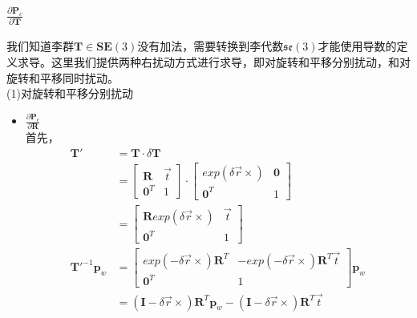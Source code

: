 \documentclass{article}
\begin{document}
\subsubsection{$\frac{\partial{\boldsymbol{P}_c}}{\partial{\boldsymbol{T}}}$}
我们知道李群$\boldsymbol{T}\in\boldsymbol{SE}(3)$没有加法，需要转换到李代数$\mathfrak{se}(3)$才能使用导数的定义求导。这里我们提供两种右扰动方式进行求导，即对旋转和平移分别扰动，和对旋转和平移同时扰动。\\
(1)对旋转和平移分别扰动
\begin{itemize}
	\item $\frac{\partial{\boldsymbol{P}_c}}{\partial{\boldsymbol{R}}}$\\
	      首先，
	      $$
	      \begin{aligned}
	      	\boldsymbol{T}'                               & = {\boldsymbol{T}} \cdot \delta\boldsymbol{T}         \\&=
	      	\left[ 
	      	\begin{matrix} 
	      	\boldsymbol{R}                                & \vec{t}                                               \\  
	      	\boldsymbol{0}^T                              & 1                                                     
	      	\end{matrix}
	      	\right]\cdot
	      	\left[
	      	\begin{matrix}
	      	exp(\delta{\vec{r}} \times)                   & \boldsymbol{0}                                        \\
	      	\boldsymbol{0}^T                              & 1                                                     
	      	\end{matrix}
	      	\right]
	      	\\&=
	      	\left[
	      	\begin{matrix}
	      	\boldsymbol{R}exp(\delta{\vec{r}}\times)      & \vec{t}                                               \\
	      	\boldsymbol{0}^T                              & 1                                                     
	      	\end{matrix}
	      	\right] \\
	      	\boldsymbol{T}'^{-1}\boldsymbol{p}_w          & =                                                     
	      	\left[
	      	\begin{matrix}
	      	exp(-\delta{\vec{r}}\times)\boldsymbol{R}^{T} & -exp(-\delta{\vec{r}}\times)\boldsymbol{R}^{T}\vec{t} \\
	      	\boldsymbol{0}^T                              & 1                                                     
	      	\end{matrix}
	      	\right]\boldsymbol{p}_w                       \\& =                                                    
	      	(\boldsymbol{I}-\delta{\vec{r}}\times)\boldsymbol{R}^{T}\boldsymbol{p}_w-(\boldsymbol{I}-\delta{\vec{r}}\times)\boldsymbol{R}^{T}\vec{t}
	      \end{aligned}
	      $$
	      	      	      	      	      

\end{itemize}
\end{document}
